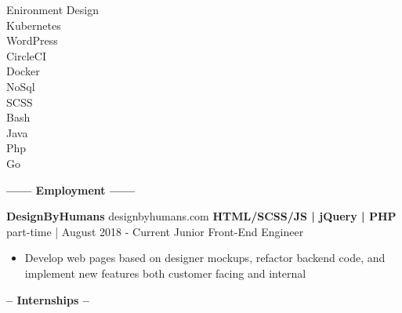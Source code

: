 \documentclass[12pt]{article}
\begin{document}
{{\begin{multicols}{2}
\begin{multicols}{2}
\begin{addmargin}[0em]{2em}
	\begin{flushright}
	\vspace{4mm}
	Enironment Design\\
	Kubernetes\\
	WordPress\\
	CircleCI\\
	Docker\\
	NoSql\\
	SCSS\\
	Bash\\
	Java\\
	Php\\
	Go\\
    \end{flushright}
    \end{addmargin}

    
    \end{multicols}
    \end{multicols}
}}
    \color{secondary}
    \center
    
    \begin{center}
    \textbf{\Large------ Employment ------}\\
    \end{center}
    \vspace{-2mm}
    \begin{footnotesize}
    \flushleft
    \textbf{\color{primary}\large DesignByHumans} {\color{primary}designbyhumans.com} \hfill \textbf{\color{Cerulean}HTML/SCSS/JS | jQuery | PHP}\\ 
    {\color{primary} part-time | August 2018 - Current} \hfill {\color{Cerulean} Junior Front-End Engineer}
    \vspace{-2mm}
    \begin{itemize}
        \setlength{\itemsep}{0pt}
        \item Develop web pages based on designer mockups, refactor backend code, and implement new features both customer facing and internal
    \end{itemize}
    \end{footnotesize}
    
    \begin{center}
    \textbf{\Large-- Internships --}\\
    \end{center}
    \vspace{-5mm}
\end{document}
